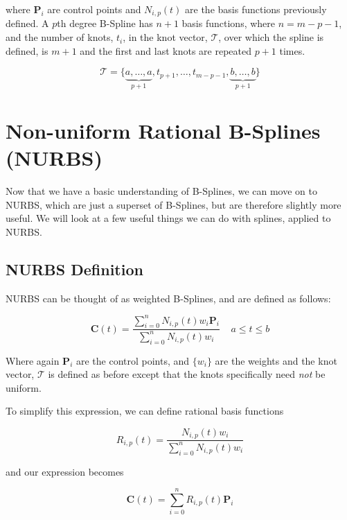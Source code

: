 where $\textbf{P}_i$ are control points and $N_{i,p}(t) $ are the basis functions previously defined. A $p$th degree B-Spline has $n+1$ basis functions, where $n = m-p-1$, and the number of knots, $t_i$, in the knot vector, $\mathcal{T}$, over which the spline is defined, is $m+1$ and the first and last knots are repeated $p+1$ times.
 
\begin{equation} \mathcal{T} = \{\underbrace{a,\ldots,a}_{p+1},t_{p+1},\ldots,t_{m-p-1},\underbrace{b,\ldots,b}_{p+1} \}  \end{equation}



\section{Non-uniform Rational B-Splines (NURBS)}
Now that we have a basic understanding of B-Splines, we can move on to NURBS, which are just a superset of B-Splines, but are therefore slightly  more useful. We will look at a few useful things we can do with splines, applied to NURBS.

\subsection{NURBS Definition}
NURBS can be thought of as weighted B-Splines, and are defined as follows:

\begin{equation}\label{eqn:nurbsdef} \textbf{C}(t) = \frac{ \displaystyle \sum^n_{i=0}N_{i,p}(t) w_i \textbf{P}_i }{ \displaystyle \sum^n_{i=0}N_{i,p}(t) w_i }~~~~~a\leq t \leq b \end{equation}  

Where again $\textbf{P}_i$ are the control points, and $\{w_i\}$ are the weights and the knot vector, $\mathcal{T}$ is defined as before except that the knots specifically need \textit{not} be uniform.

To simplify this expression, we can define rational basis functions

\begin{equation} R_{i,p}(t) = \frac{ N_{i,p}(t) w_i } { \displaystyle \sum^n_{i=0}N_{i,p}(t) w_i }\end{equation}  

and our expression becomes

\begin{equation} \textbf{C}(t) = \sum^n_{i=0} R_{i,p}(t) \textbf{P}_i  \end{equation}  

